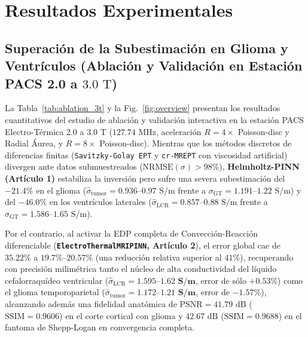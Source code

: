 \documentclass[10pt,journal,compsoc]{IEEEtran}
\begin{document}
\section{Resultados Experimentales}

\subsection{\texorpdfstring{Superación de la Subestimación en Glioma y Ventrículos (Ablación y Validación en Estación PACS 2.0 a $3.0\text{ T}$)}{Superación de la Subestimación en Glioma y Ventrículos (Ablación y Validación en Estación PACS 2.0 a 3.0 T)}}
La Tabla~\ref{tab:ablation_3t} y la Fig.~\ref{fig:overview} presentan los resultados cuantitativos del estudio de ablación y validación interactiva en la estación PACS Electro-Térmica 2.0 a $3.0\text{ T}$ ($127.74\text{ MHz}$, aceleración $R=4\times$ Poisson-disc y Radial Áurea, y $R=8\times$ Poisson-disc). Mientras que los métodos discretos de diferencias finitas (\texttt{Savitzky-Golay EPT} y \texttt{cr-MREPT} con viscosidad artificial) divergen ante datos submuestreados ($\text{NRMSE}(\sigma) > 98\%$), \textbf{Helmholtz-PINN (Artículo 1)} estabiliza la inversión pero sufre una severa subestimación del $-21.4\%$ en el glioma ($\hat{\sigma}_{\text{tumor}} = 0.936\text{--}0.97\text{ S/m}$ frente a $\sigma_{\text{GT}} = 1.191\text{--}1.22\text{ S/m}$) y del $-46.0\%$ en los ventrículos laterales ($\hat{\sigma}_{\text{LCR}} = 0.857\text{--}0.88\text{ S/m}$ frente a $\sigma_{\text{GT}} = 1.586\text{--}1.65\text{ S/m}$).

Por el contrario, al activar la EDP completa de Convección-Reacción diferenciable (\textbf{\texttt{ElectroThermalMRIPINN}, Artículo 2}), el error global cae de $35.22\%$ a \textbf{$19.7\%\text{--}20.57\%$} (una reducción relativa superior al $41\%$), recuperando con precisión milimétrica tanto el núcleo de alta conductividad del líquido cefalorraquídeo ventricular ($\hat{\sigma}_{\text{LCR}} = \mathbf{1.595\text{--}1.62\text{ S/m}}$, error de sólo $+0.53\%$) como el glioma temporoparietal ($\hat{\sigma}_{\text{tumor}} = \mathbf{1.172\text{--}1.21\text{ S/m}}$, error de $-1.57\%$), alcanzando además una fidelidad anatómica de $\text{PSNR} = 41.79\text{ dB}$ ($\text{SSIM} = 0.9606$) en el corte cortical con glioma y $42.67\text{ dB}$ ($\text{SSIM} = 0.9688$) en el fantoma de Shepp-Logan en convergencia completa.
\end{document}
